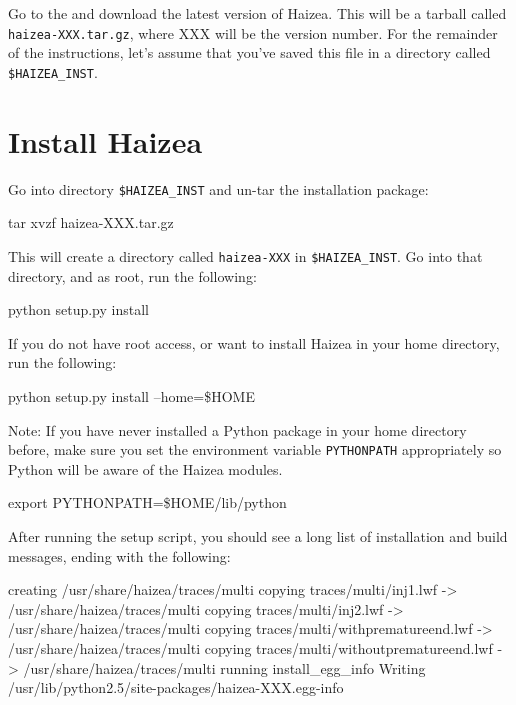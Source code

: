 Go to the  and download the latest version of Haizea. This will be a tarball called \texttt{haizea-XXX.tar.gz}, where XXX will be the version number. For the remainder of the instructions, let's assume that you've saved this file in a directory called \texttt{\$HAIZEA\_INST}.

\section{Install Haizea}

Go into directory \texttt{\$HAIZEA\_INST} and un-tar the installation package:

\begin{shellverbatim}
tar xvzf haizea-XXX.tar.gz
\end{shellverbatim}

This will create a directory called \texttt{haizea-XXX} in \texttt{\$HAIZEA\_INST}. Go into that directory, and as root, run the following:

\begin{shellverbatim}
python setup.py install
\end{shellverbatim}

If you do not have root access, or want to install Haizea in your home directory, run the following:

\begin{shellverbatim}
python setup.py install --home=\$HOME
\end{shellverbatim}

Note: If you have never installed a Python package in your home directory before, make sure you set the environment variable \texttt{PYTHONPATH} appropriately so Python will be aware of the Haizea modules.

\begin{shellverbatim}
export PYTHONPATH=\$HOME/lib/python
\end{shellverbatim}

After running the setup script, you should see a long list of installation and build messages, ending with the following:

\begin{wideshellverbatim}
creating /usr/share/haizea/traces/multi
copying traces/multi/inj1.lwf -> /usr/share/haizea/traces/multi
copying traces/multi/inj2.lwf -> /usr/share/haizea/traces/multi
copying traces/multi/withprematureend.lwf -> /usr/share/haizea/traces/multi
copying traces/multi/withoutprematureend.lwf -> /usr/share/haizea/traces/multi
running install_egg_info
Writing /usr/lib/python2.5/site-packages/haizea-XXX.egg-info
\end{wideshellverbatim}

